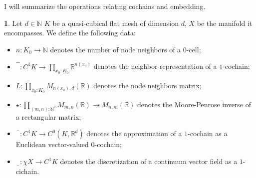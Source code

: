 \documentclass[fleqn]{article}
\theoremstyle{definition}
\newtheorem{discussion}[theorem]{}
\newcommand{\N}{\mathbb{N}}
\newcommand{\R}{\mathbb{R}}
\begin{document}
I will summarize the operations relating cochains and embedding.
\begin{discussion}
  Let
    $d \in \N$
    $K$ be a quasi-cubical flat mesh of dimension $d$,
    $X$ be the manifold it encompasses.
  We define the following data:
  \begin{itemize}
    \item
      $n \colon K_0 \to \N$ denotes the number of node neighbors of a $0$-cell;
    \item
      $\widehat{\phantom{T}} \colon C^1 K \to 
        \displaystyle \prod_{x_0 \colon K_0} \R^{n(x_0)}$
      denotes the neighbor representation of a $1$-cochain;
    \item
      $L \colon \prod_{x_0 \colon K_0} M_{n(x_0), d}(\R)$
      denotes the node neighbors matrix;
    \item
      $\displaystyle
        \star \colon \prod_{(m, n) \colon \N^2} M_{m, n}(\R) \to M_{n, m}(\R)$
      denotes the Moore-Penrose inverse of a rectangular matrix;
    \item
      $\overline{\phantom{T}} \colon C^1 K \to C^0(K, \R^d)$
      denotes the approximation of a $1$-cochain as a Euclidean vector-valued
      $0$-cochain;
    \item
      $\underline{\phantom{T}} \colon \chi X \to C^1 K$
      denotes the discretization of a continuum vector field as a $1$-cichain.
  \end{itemize}
\end{discussion}
\end{document}
